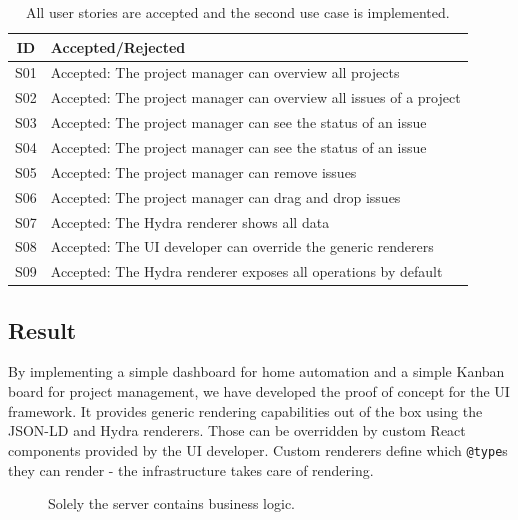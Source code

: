 \begin{table}
  \begin{center}
    \begin{tabular}{ |c|l| }
      \hline
      ID & Accepted/Rejected \\
      \hline
      S01 & Accepted: The project manager can overview all projects \\
      S02 & Accepted: The project manager can overview all issues of a project \\
      S03 & Accepted: The project manager can see the status of an issue \\
      S04 & Accepted: The project manager can see the status of an issue \\
      S05 & Accepted: The project manager can remove issues \\
      S06 & Accepted: The project manager can drag and drop issues \\
      S07 & Accepted: The Hydra renderer shows all data \\
      S08 & Accepted: The UI developer can override the generic renderers \\
      S09 & Accepted: The Hydra renderer exposes all operations by default \\
      \hline
    \end{tabular}
    \caption{All user stories are accepted and the second use case is implemented.}
  \end{center}
\end{table}

\subsection{Result}
By implementing a simple dashboard for home automation and a simple Kanban board for project management, we have developed the proof of concept for the UI framework. It provides generic rendering capabilities out of the box using the JSON-LD and Hydra renderers. Those can be overridden by custom React components provided by the UI developer. Custom renderers define which \lstinline{@type}s they can render - the infrastructure takes care of rendering.

\begin{figure}[!htb]
  \caption{Solely the server contains business logic.}
  \label{fig:businesslogic}
\end{figure}

